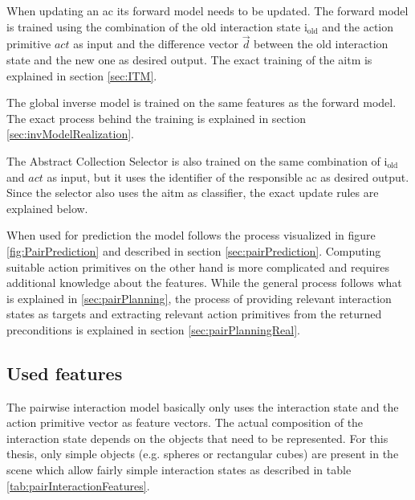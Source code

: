 When updating an \gls{ac} its forward model needs to be updated. The forward model is trained using the combination of the old interaction state  i$_\text{old}$ and the action primitive $act$ as input and the difference vector $\vec{d}$ between the old interaction state and the new one as desired output. The exact training of the \gls{aitm} is explained in section \ref{sec:ITM}. 

The global inverse model is trained on the same features as the forward model. The exact process behind the training is explained in section \ref{sec:invModelRealization}.

The Abstract Collection Selector is also trained on the same combination of i$_\text{old}$ and $act$ as input, but it uses the identifier of the responsible \gls{ac} as desired output.
Since the selector also uses the \gls{aitm} as classifier, the exact update rules are explained below.

When used for prediction the model follows the process visualized in figure \ref{fig:PairPrediction} and described in section \ref{sec:pairPrediction}.
Computing suitable action primitives on the other hand is more complicated and requires additional knowledge about the features. While the general process follows what is explained in \ref{sec:pairPlanning}, the process of providing relevant interaction states as targets and extracting relevant action primitives from the returned preconditions is explained in section \ref{sec:pairPlanningReal}.



\subsection{Used features \label{sec:intFeatures}}

The pairwise interaction model basically only uses the interaction state and the action primitive vector as feature vectors. The actual composition of the interaction state depends on the objects that need to be represented. For this thesis, only simple objects (e.g. spheres or rectangular cubes) are present in the scene which allow fairly simple interaction states as described in table \ref{tab:pairInteractionFeatures}.

